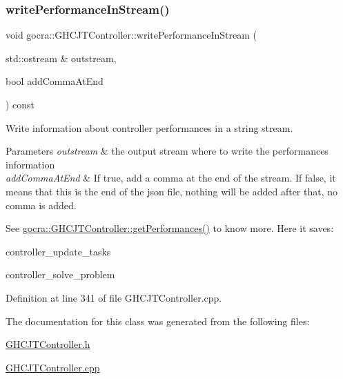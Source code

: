 \subsubsection{\texorpdfstring{write\+Performance\+In\+Stream()}{writePerformanceInStream()}}
{\footnotesize\ttfamily void gocra\+::\+G\+H\+C\+J\+T\+Controller\+::write\+Performance\+In\+Stream (\begin{DoxyParamCaption}\item[{std\+::ostream \&}]{outstream,  }\item[{bool}]{add\+Comma\+At\+End }\end{DoxyParamCaption}) const}

Write information about controller performances in a string stream.


\begin{DoxyParams}{Parameters}
{\em outstream} & the output stream where to write the performances information \\
\hline
{\em add\+Comma\+At\+End} & If true, add a comma at the end of the stream. If false, it means that this is the end of the json file, nothing will be added after that, no comma is added.\\
\hline
\end{DoxyParams}
See \hyperlink{classgocra_1_1GHCJTController_add50119553cb0f5de3f5639523968939}{gocra\+::\+G\+H\+C\+J\+T\+Controller\+::get\+Performances()} to know more. Here it saves\+:


\begin{DoxyItemize}
\item controller\+\_\+update\+\_\+tasks
\item controller\+\_\+solve\+\_\+problem 
\end{DoxyItemize}

Definition at line 341 of file G\+H\+C\+J\+T\+Controller.\+cpp.



The documentation for this class was generated from the following files\+:\begin{DoxyCompactItemize}
\item 
\hyperlink{GHCJTController_8h}{G\+H\+C\+J\+T\+Controller.\+h}\item 
\hyperlink{GHCJTController_8cpp}{G\+H\+C\+J\+T\+Controller.\+cpp}\end{DoxyCompactItemize}

